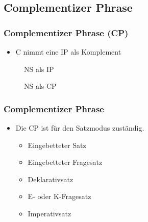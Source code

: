\subsection{Complementizer Phrase}

\begin{frame}
\frametitle{Complementizer Phrase (CP)}

\begin{itemize}
	\item C nimmt eine IP als Komplement
\end{itemize}

\begin{minipage}[b]{0.45\textwidth}
\begin{figure}
	\centering
		\caption{NS als IP}	
\end{figure}		
\end{minipage}  
\pause
\begin{minipage}[b]{0.45\textwidth}
\begin{figure}
	\centering
		\caption{NS als CP}	
\end{figure}		
\end{minipage}  

\nocite{Fries&MyP16i}

\end{frame}


\begin{frame}
\frametitle{Complementizer Phrase}

\begin{itemize}
	\item Die CP ist für den Satzmodus zuständig.
	\begin{itemize}
		\item Eingebetteter Satz
		\item Eingebetteter Fragesatz
		\item Deklarativsatz
		\item E- oder K-Fragesatz
		\item Imperativsatz
	\end{itemize}
\end{itemize}
\end{frame}



